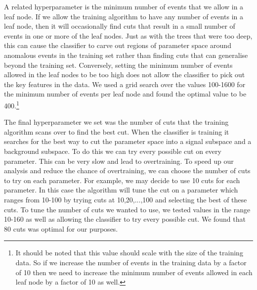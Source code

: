 \documentclass[11pt]{cuthesis}
\begin{document}
A related hyperparameter is the minimum number of events that we allow in a leaf node. If we allow the training algorithm to have any number of events in a leaf node, then it will occasionally find cuts that result in a small number of events in one or more of the leaf nodes. Just as with the trees that were too deep, this can cause the classifier to carve out regions of parameter space around anomalous events in the training set rather than finding cuts that can generalise beyond the training set. Conversely, setting the minimum number of events allowed in the leaf nodes to be too high does not allow the classifier to pick out the key features in the data. We used a grid search over the values 100-1600 for the minimum number of events per leaf node and found the optimal value to be 400.\footnote{It should be noted that this value should scale with the size of the training data. So if we increase the number of events in the training data by a factor of 10 then we need to increase the minimum number of events allowed in each leaf node by a factor of 10 as well.} 

The final hyperparameter we set was the number of cuts that the training algorithm scans over to find the best cut. When the classifier is training it searches for the best way to cut the parameter space into a signal subspace and a background subspace. To do this we can try every possible cut on every parameter. This can be very slow and lead to overtraining. To speed up our analysis and reduce the chance of overtraining, we can choose the number of cuts to try on each parameter. For example, we may decide to use 10 cuts for each parameter. In this case the algorithm will tune the cut on a parameter which ranges from 10-100 by trying cuts at 10,20,...,100 and selecting the best of these cuts. To tune the number of cuts we wanted to use, we tested values in the range 10-160 as well as allowing the classifier to try every possible cut. We found that 80 cuts was optimal for our purposes. 
\end{document}
